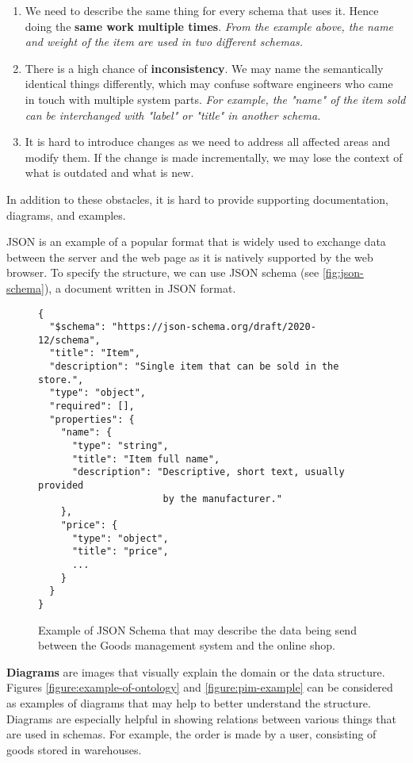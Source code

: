 \begin{enumerate}
    \item We need to describe the same thing for every schema that uses it. Hence doing the \textbf{same work multiple times}. \textit{From the example above, the name and weight of the item are used in two different schemas.}
    \item There is a high chance of \textbf{inconsistency}. We may name the semantically identical things differently, which may confuse software engineers who came in touch with multiple system parts. \textit{For example, the "name" of the item sold can be interchanged with "label" or "title" in another schema.}
    \item It is hard to introduce changes as we need to address all affected areas and modify them. If the change is made incrementally, we may lose the context of what is outdated and what is new.
\end{enumerate}

In addition to these obstacles, it is hard to provide supporting documentation, diagrams, and examples.

\bigskip

JSON is an example of a popular format that is widely used to exchange data between the server and the web page as it is natively supported by the web browser. To specify the structure, we can use JSON schema (see \autoref{fig:json-schema}), a document written in JSON format.

\begin{figure}[h]
\begin{verbatim}
{
  "$schema": "https://json-schema.org/draft/2020-12/schema",
  "title": "Item",
  "description": "Single item that can be sold in the store.",
  "type": "object",
  "required": [],
  "properties": {
    "name": {
      "type": "string",
      "title": "Item full name",
      "description": "Descriptive, short text, usually provided
                      by the manufacturer."
    },
    "price": {
      "type": "object",
      "title": "price",
      ...
    }
  }
}
\end{verbatim}
\caption{Example of JSON Schema that may describe the data being send between the Goods management system and the online shop.}
\label{fig:json-schema}
\end{figure}

\textbf{Diagrams} are images that visually explain the domain or the data structure. Figures \ref{figure:example-of-ontology} and \ref{figure:pim-example} can be considered as examples of diagrams that may help to better understand the structure. Diagrams are especially helpful in showing relations between various things that are used in schemas. For example, the order is made by a user, consisting of goods stored in warehouses.

